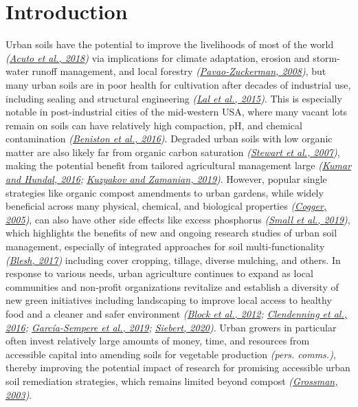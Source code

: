\documentclass[
  12pt,
]{article}
\begin{document}
\hypertarget{introduction}{%
\section{Introduction}\label{introduction}}

Urban soils have the potential to improve the livelihoods of most of the world \emph{(\protect\hyperlink{ref-acuto18}{Acuto et al., 2018})} via implications for climate adaptation, erosion and storm-water runoff management, and local forestry \emph{(\protect\hyperlink{ref-pavao-zuckerman08}{Pavao-Zuckerman, 2008})}, but many urban soils are in poor health for cultivation after decades of industrial use, including sealing and structural engineering \emph{(\protect\hyperlink{ref-lal15}{Lal et al., 2015})}.
This is especially notable in post-industrial cities of the mid-western USA, where many vacant lots remain on soils can have relatively high compaction, pH, and chemical contamination \emph{(\protect\hyperlink{ref-beniston16}{Beniston et al., 2016})}.
Degraded urban soils with low organic matter are also likely far from organic carbon saturation \emph{(\protect\hyperlink{ref-stewart07}{Stewart et al., 2007})}, making the potential benefit from tailored agricultural management large \emph{(\protect\hyperlink{ref-kumar16}{Kumar and Hundal, 2016}; \protect\hyperlink{ref-kuzyakov19}{Kuzyakov and Zamanian, 2019})}.
However, popular single strategies like organic compost amendments to urban gardens, while widely beneficial across many physical, chemical, and biological properties \emph{(\protect\hyperlink{ref-cogger05}{Cogger, 2005})}, can also have other side effects like excess phosphorus \emph{(\protect\hyperlink{ref-small19}{Small et al., 2019})}, which highlights the benefits of new and ongoing research studies of urban soil management, especially of integrated approaches for soil multi-functionality \emph{(\protect\hyperlink{ref-blesh17}{Blesh, 2017})} including cover cropping, tillage, diverse mulching, and others.
In response to various needs, urban agriculture continues to expand as local communities and non-profit organizations revitalize and establish a diversity of new green initiatives including landscaping to improve local access to healthy food and a cleaner and safer environment \emph{(\protect\hyperlink{ref-block12}{Block et al., 2012}; \protect\hyperlink{ref-clendenning16}{Clendenning et al., 2016}; \protect\hyperlink{ref-garcia-sempere19}{García-Sempere et al., 2019}; \protect\hyperlink{ref-siebert20}{Siebert, 2020})}.
Urban growers in particular often invest relatively large amounts of money, time, and resources from accessible capital into amending soils for vegetable production \emph{(pers. comms.)},
thereby improving the potential impact of research for promising accessible urban soil remediation strategies, which remains limited beyond compost \emph{(\protect\hyperlink{ref-grossman03}{Grossman, 2003})}.
\end{document}
